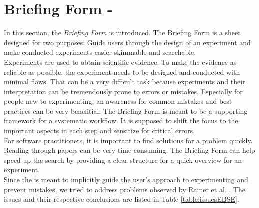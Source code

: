 
\section{Briefing Form - \briefingform}
\label{sec:briefing form}

In this section, the \textit{Briefing Form} is introduced. The Briefing Form is a sheet designed for two purposes: Guide users through the design of an experiment and make conducted experiments easier skimmable and searchable.\\
Experiments are used to obtain scientific evidence. To make the evidence as reliable as possible, the experiment needs to be designed and conducted with minimal flaws. That can be a very difficult task because experiments and their interpretation can be tremendously prone to errors or mistakes. Especially for people new to experimenting, an awareness for common mistakes and best practices can be very benefitial.
The Briefing Form is meant to be a  supporting framework for a systematic workflow. It is supposed to shift the focus to the important aspects in each step and sensitize for critical errors.\\
For software practitioners, it is important to find solutions for a problem quickly. Reading through papers can be very time consuming. The Briefing Form can help speed up the search by providing a clear structure for a quick overview for an experiment.\\
Since the \briefingform is meant to implicitly guide the user's approach to experimenting and prevent mistakes, we tried to address problems observed  by Rainer et al. \cite{Rainer2006}. The issues and their respective conclusions are listed in Table \ref{table:issuesEBSE}.
